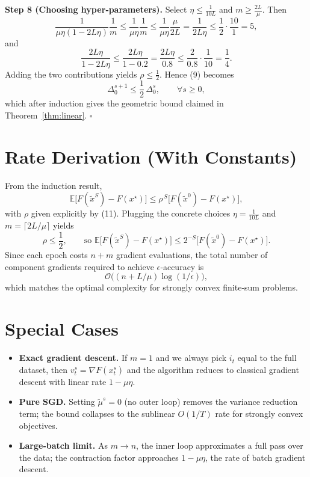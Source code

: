 \documentclass{article}
\newcommand{\E}{\mathbb{E}}
\begin{document}
\noindent\textbf{Step 8 (Choosing hyper‑parameters).}  
Select $\eta\le\frac{1}{10L}$ and $m\ge\frac{2L}{\mu}$. Then
\[
\frac{1}{\mu\eta(1-2L\eta)}\frac{1}{m}
\le\frac{1}{\mu\eta}\frac{1}{m}
\le\frac{1}{\mu\eta}\frac{\mu}{2L}
= \frac{1}{2L\eta}\le\frac{1}{2}\cdot\frac{10}{1}=5,
\]
and
\[
\frac{2L\eta}{1-2L\eta}\le\frac{2L\eta}{1-0.2}= \frac{2L\eta}{0.8}\le\frac{2}{0.8}\cdot\frac{1}{10}= \frac{1}{4}.
\]
Adding the two contributions yields $\rho\le\frac12$. Hence (9) becomes
\[
\Delta_{0}^{s+1}\le \frac12\,\Delta_{0}^{s},\qquad\forall s\ge0,
\]
which after induction gives the geometric bound claimed in Theorem~\ref{thm:linear}. \(\square\)

\section*{Rate Derivation (With Constants)}
From the induction result,
\[
\E\!\bigl[F(\tilde{x}^{S})-F(x^{\star})\bigr]\le\rho^{\,S}\bigl[F(\tilde{x}^{0})-F(x^{\star})\bigr],
\]
with $\rho$ given explicitly by (11). Plugging the concrete choices $\eta=\frac{1}{10L}$ and $m= \lceil 2L/\mu\rceil$ yields
\[
\rho\le\frac{1}{2},\qquad
\text{so } \E\!\bigl[F(\tilde{x}^{S})-F(x^{\star})\bigr]\le 2^{-S}\bigl[F(\tilde{x}^{0})-F(x^{\star})\bigr].
\]
Since each epoch costs $n+m$ gradient evaluations, the total number of component gradients required to achieve $\epsilon$‑accuracy is
\[
\mathcal{O}\!\bigl((n+L/\mu)\log(1/\epsilon)\bigr),
\]
which matches the optimal complexity for strongly convex finite‑sum problems.

\section*{Special Cases}
\begin{itemize}[leftmargin=*]
\item \textbf{Exact gradient descent.} If $m=1$ and we always pick $i_t$ equal to the full dataset, then $v_{t}^{s}=\nabla F(x_{t}^{s})$ and the algorithm reduces to classical gradient descent with linear rate $1-\mu\eta$.
\item \textbf{Pure SGD.} Setting $\tilde{\mu}^{s}=0$ (no outer loop) removes the variance reduction term; the bound collapses to the sublinear $O(1/T)$ rate for strongly convex objectives.
\item \textbf{Large‑batch limit.} As $m\to n$, the inner loop approximates a full pass over the data; the contraction factor approaches $1- \mu\eta$, the rate of batch gradient descent.
\end{itemize}
\end{document}
